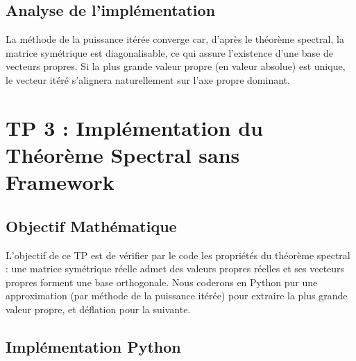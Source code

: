 \documentclass[11pt,a4paper]{article}
\begin{document}
\subsection{Analyse de l'implémentation}
La méthode de la puissance itérée converge car, d'après le théorème spectral, la matrice symétrique est diagonalisable, ce qui assure l'existence d'une base de vecteurs propres. Si la plus grande valeur propre (en valeur absolue) est unique, le vecteur itéré s'alignera naturellement sur l'axe propre dominant.

\newpage
\section{TP 3 : Implémentation du Théorème Spectral sans Framework}

\subsection{Objectif Mathématique}
L'objectif de ce TP est de vérifier par le code les propriétés du théorème spectral : une matrice symétrique réelle admet des valeurs propres réelles et ses vecteurs propres forment une base orthogonale. Nous coderons en Python pur une approximation (par méthode de la puissance itérée) pour extraire la plus grande valeur propre, et déflation pour la suivante.

\subsection{Implémentation Python}
\end{document}
